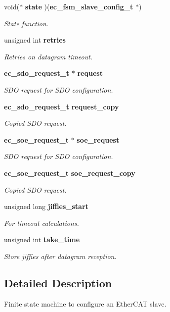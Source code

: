 \begin{DoxyCompactItemize}
void($\ast$ {\bf state} )({\bf ec\-\_\-fsm\-\_\-slave\-\_\-config\-\_\-t} $\ast$)
\begin{DoxyCompactList}\small\item\em \-State function. \end{DoxyCompactList}\item 
unsigned int {\bf retries}
\begin{DoxyCompactList}\small\item\em \-Retries on datagram timeout. \end{DoxyCompactList}\item 
{\bf ec\-\_\-sdo\-\_\-request\-\_\-t} $\ast$ {\bf request}
\begin{DoxyCompactList}\small\item\em \-S\-D\-O request for \-S\-D\-O configuration. \end{DoxyCompactList}\item 
{\bf ec\-\_\-sdo\-\_\-request\-\_\-t} {\bf request\-\_\-copy}
\begin{DoxyCompactList}\small\item\em \-Copied \-S\-D\-O request. \end{DoxyCompactList}\item 
{\bf ec\-\_\-soe\-\_\-request\-\_\-t} $\ast$ {\bf soe\-\_\-request}
\begin{DoxyCompactList}\small\item\em \-S\-D\-O request for \-S\-D\-O configuration. \end{DoxyCompactList}\item 
{\bf ec\-\_\-soe\-\_\-request\-\_\-t} {\bf soe\-\_\-request\-\_\-copy}
\begin{DoxyCompactList}\small\item\em \-Copied \-S\-D\-O request. \end{DoxyCompactList}\item 
unsigned long {\bf jiffies\-\_\-start}
\begin{DoxyCompactList}\small\item\em \-For timeout calculations. \end{DoxyCompactList}\item 
unsigned int {\bf take\-\_\-time}
\begin{DoxyCompactList}\small\item\em \-Store jiffies after datagram reception. \end{DoxyCompactList}\end{DoxyCompactItemize}


\subsection{\-Detailed \-Description}
\-Finite state machine to configure an \-Ether\-C\-A\-T slave. 

